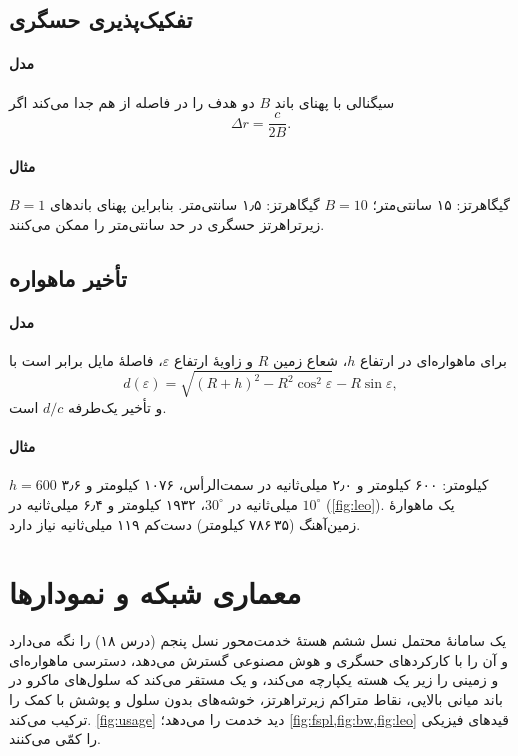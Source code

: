 \documentclass[11pt,a4paper]{article}
\begin{document}
\subsection{تفکیک‌پذیری حسگری}\label{sec:isac}
\paragraph{مدل} سیگنالی با پهنای باند $B$ دو هدف را در فاصله از هم جدا می‌کند اگر
\begin{equation}\label{eq:range}
  \Delta r = \frac{c}{2B} .
\end{equation}
\paragraph{مثال} $B = 1$ گیگاهرتز: ۱۵ سانتی‌متر؛ $B = 10$ گیگاهرتز: ۱٫۵ سانتی‌متر. بنابراین پهنای باندهای زیرتراهرتز حسگری در حد سانتی‌متر را ممکن می‌کنند.

\subsection{تأخیر ماهواره}\label{sec:leo}
\paragraph{مدل} برای ماهواره‌ای در ارتفاع $h$، شعاع زمین $R$ و زاویهٔ ارتفاع $\varepsilon$، فاصلهٔ مایل برابر است با
\begin{equation}\label{eq:slant}
  d(\varepsilon) = \sqrt{(R + h)^2 - R^2\cos^2\varepsilon} - R\sin\varepsilon ,
\end{equation}
و تأخیر یک‌طرفه $d/c$ است.
\paragraph{مثال} $h = 600$ کیلومتر: ۶۰۰ کیلومتر و ۲٫۰ میلی‌ثانیه در سمت‌الرأس، ۱۰۷۶ کیلومتر و ۳٫۶ میلی‌ثانیه در $30^\circ$، ۱۹۳۲ کیلومتر و ۶٫۴ میلی‌ثانیه در $10^\circ$
(\cref{fig:leo}). یک ماهوارهٔ زمین‌آهنگ (۳۵\,۷۸۶ کیلومتر) دست‌کم ۱۱۹ میلی‌ثانیه نیاز دارد.

\begin{acnfigure}
  \caption{تأخیر انتشار یک‌طرفه تا یک ماهوارهٔ  (\cref{eq:slant}).}
  \label{fig:leo}
\end{acnfigure}

\section{معماری شبکه و نمودارها}
یک سامانهٔ محتمل نسل ششم هستهٔ خدمت‌محور نسل پنجم (درس ۱۸) را نگه می‌دارد و آن را با کارکردهای حسگری و هوش مصنوعی گسترش می‌دهد، دسترسی ماهواره‌ای و
زمینی را زیر یک هسته یکپارچه می‌کند، و یک  مستقر می‌کند که سلول‌های ماکرو در باند میانی بالایی، نقاط متراکم زیرتراهرتز، خوشه‌های بدون سلول و
پوشش با کمک  را ترکیب می‌کند. \cref{fig:usage} دید خدمت را می‌دهد؛ \cref{fig:fspl,fig:bw,fig:leo} قیدهای فیزیکی را کمّی می‌کنند.
\end{document}
